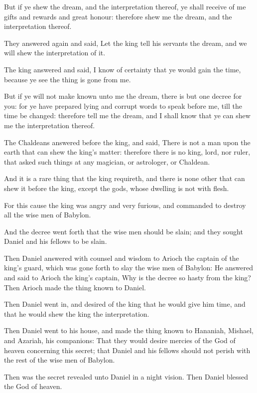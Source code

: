 \verse But if ye shew the dream, and the interpretation thereof, ye shall receive of me gifts and rewards and great honour: therefore shew me the dream, and the interpretation thereof.

\verse They answered again and said, Let the king tell his servants the dream, and we will shew the interpretation of it.

\verse The king answered and said, I know of certainty that ye would gain the time, because ye see the thing is gone from me.

\verse But if ye will not make known unto me the dream, there is but one decree for you: for ye have prepared lying and corrupt words to speak before me, till the time be changed: therefore tell me the dream, and I shall know that ye can shew me the interpretation thereof.

\verse The Chaldeans answered before the king, and said, There is not a man upon the earth that can shew the king's matter: therefore there is no king, lord, nor ruler, that asked such things at any magician, or astrologer, or Chaldean.

\verse And it is a rare thing that the king requireth, and there is none other that can shew it before the king, except the gods, whose dwelling is not with flesh.

\verse For this cause the king was angry and very furious, and commanded to destroy all the wise men of Babylon.

\verse And the decree went forth that the wise men should be slain; and they sought Daniel and his fellows to be slain.

\verse Then Daniel answered with counsel and wisdom to Arioch the captain of the king's guard, which was gone forth to slay the wise men of Babylon: \verse He answered and said to Arioch the king's captain, Why is the decree so hasty from the king? Then Arioch made the thing known to Daniel.

\verse Then Daniel went in, and desired of the king that he would give him time, and that he would shew the king the interpretation.

\verse Then Daniel went to his house, and made the thing known to Hananiah, Mishael, and Azariah, his companions: \verse That they would desire mercies of the God of heaven concerning this secret; that Daniel and his fellows should not perish with the rest of the wise men of Babylon.

\verse Then was the secret revealed unto Daniel in a night vision. Then Daniel blessed the God of heaven.

